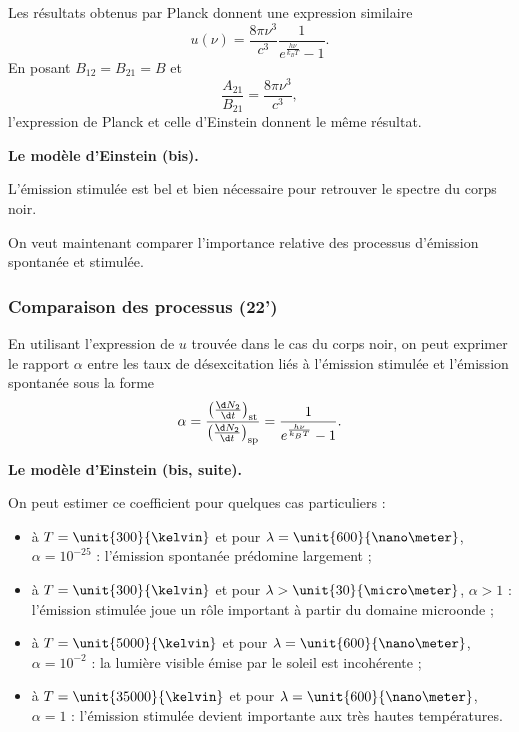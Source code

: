 Les résultats obtenus par Planck donnent une expression similaire
\begin{equation}
u(\nu) = \frac{8\pi\nu^3}{c^3} \frac{1}{e^{\frac{h\nu}{k_B T}} - 1}.
\end{equation}
En posant $B_{12} = B_{21} = B$ et
\begin{equation}
\frac{A_{21}}{B_{21}} = \frac{8\pi\nu^3}{c^3},
\end{equation}
l'expression de Planck et celle d'Einstein donnent le même résultat.

\begin{slide}
\textbf{Le modèle d'Einstein (bis).}
\end{slide}

L'émission stimulée est bel et bien nécessaire pour retrouver le spectre du corps noir.

\begin{transition}
On veut maintenant comparer l'importance relative des processus d'émission spontanée et stimulée.
\end{transition}

\subsubsection{Comparaison des processus (22')}

En utilisant l'expression de $u$ trouvée dans le cas du corps noir, on peut exprimer le rapport $\alpha$ entre les taux de désexcitation liés à l'émission stimulée et l'émission spontanée sous la forme
\begin{equation}
\alpha = \frac{\left(\frac{\d N_2}{\d t}\right)_\mathrm{st}}{\left(\frac{\d N_2}{\d t}\right)_\mathrm{sp}} = \frac{1}{e^{\frac{h\nu}{k_B T}} - 1}.
\end{equation}

\begin{slide}
\textbf{Le modèle d'Einstein (bis, suite).}
\end{slide}

On peut estimer ce coefficient pour quelques cas particuliers :
\begin{itemize}
\item à $T=\unit{300}{\kelvin}$ et pour $\lambda=\unit{600}{\nano\meter}$, $\alpha = 10^{-25}$ : l'émission spontanée prédomine largement ;
\item à $T=\unit{300}{\kelvin}$ et pour $\lambda > \unit{30}{\micro\meter}$, $\alpha > 1$ : l'émission stimulée joue un rôle important à partir du domaine microonde ;
\item à $T=\unit{5000}{\kelvin}$ et pour $\lambda=\unit{600}{\nano\meter}$, $\alpha = 10^{-2}$ : la lumière visible émise par le soleil est incohérente ;
\item à $T=\unit{35000}{\kelvin}$ et pour $\lambda=\unit{600}{\nano\meter}$, $\alpha = 1$ : l'émission stimulée devient importante aux très hautes températures.
\end{itemize}

